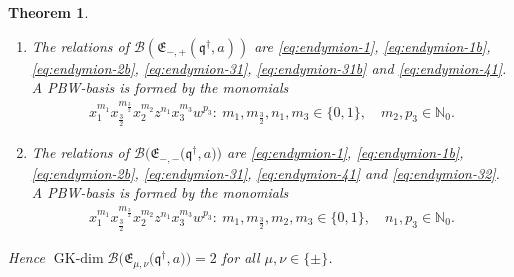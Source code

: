 \documentclass[10pt,a4paper]{amsart}
\numberwithin{equation}{section}
\newtheorem{Theorem}{Theorem}[section]
\newcommand{\GK}{\operatorname{GK-dim}}
\newcommand{\toba}{\mathscr B}
\newcommand{\N}{{\mathbb N}}
\newcommand{\eny}{\mathfrak{E}}
\newcommand{\bq}{\mathfrak{q}}
\newcommand{\bqs}{\bq^{\dagger}}
\newcommand{\tresdos}{\frac{3}{2}}
\begin{document}
\begin{Theorem}
\begin{enumerate}[label=$(\alph*)$]
\item The relations of $\toba(\eny_{-, +}(\bqs, a))$ are
\eqref{eq:endymion-1}, \eqref{eq:endymion-1b}, \eqref{eq:endymion-2b}, \eqref{eq:endymion-31}, \eqref{eq:endymion-31b} and \eqref{eq:endymion-41}.
A PBW-basis is formed by the monomials
\begin{align*}
x_1^{m_1} x_{\tresdos}^{m_{\tresdos}} x_2^{m_2}z^{n_{1}}x_{3}^{m_{3}}w^{p_{3}}\colon\
m_1, m_{\tresdos}, n_1, m_3\in \{0,1\}, \quad m_2, p_{3} \in\N_0.
\end{align*}

\item The relations of $\toba\big(\eny_{-, -}\big(\bqs, a\big)\big)$ are \eqref{eq:endymion-1}, \eqref{eq:endymion-1b}, \eqref{eq:endymion-2b}, \eqref{eq:endymion-31},
\eqref{eq:endymion-41} and \eqref{eq:endymion-32}. A PBW-basis is formed by the monomials
\begin{align*}
x_1^{m_1} x_{\tresdos}^{m_{\tresdos}} x_2^{m_2}z^{n_{1}}x_{3}^{m_{3}}w^{p_{3}}\colon\
m_1, m_{\tresdos}, m_2, m_3\in \{0,1\}, \quad n_1, p_{3} \in\N_0.
\end{align*}
\end{enumerate}

Hence
$\GK \toba\big(\eny_{\mu, \nu}\big(\bqs, a\big)\big) = 2$ for all $\mu, \nu \in \{\pm\}$.
\end{Theorem}
\end{document}
